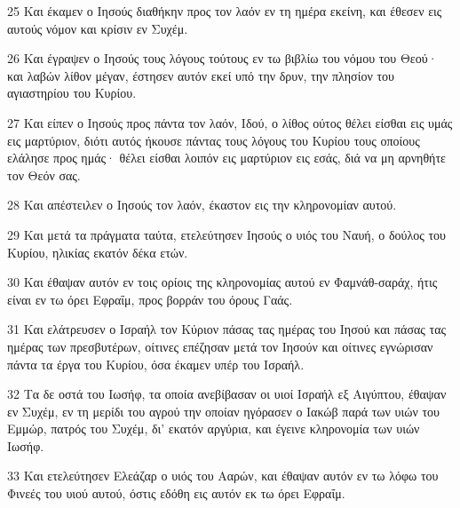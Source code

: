 \par 25 Και έκαμεν ο Ιησούς διαθήκην προς τον λαόν εν τη ημέρα εκείνη, και έθεσεν εις αυτούς νόμον και κρίσιν εν Συχέμ.
\par 26 Και έγραψεν ο Ιησούς τους λόγους τούτους εν τω βιβλίω του νόμου του Θεού· και λαβών λίθον μέγαν, έστησεν αυτόν εκεί υπό την δρυν, την πλησίον του αγιαστηρίου του Κυρίου.
\par 27 Και είπεν ο Ιησούς προς πάντα τον λαόν, Ιδού, ο λίθος ούτος θέλει είσθαι εις υμάς εις μαρτύριον, διότι αυτός ήκουσε πάντας τους λόγους του Κυρίου τους οποίους ελάλησε προς ημάς· θέλει είσθαι λοιπόν εις μαρτύριον εις εσάς, διά να μη αρνηθήτε τον Θεόν σας.
\par 28 Και απέστειλεν ο Ιησούς τον λαόν, έκαστον εις την κληρονομίαν αυτού.
\par 29 Και μετά τα πράγματα ταύτα, ετελεύτησεν Ιησούς ο υιός του Ναυή, ο δούλος του Κυρίου, ηλικίας εκατόν δέκα ετών.
\par 30 Και έθαψαν αυτόν εν τοις ορίοις της κληρονομίας αυτού εν Φαμνάθ-σαράχ, ήτις είναι εν τω όρει Εφραΐμ, προς βορράν του όρους Γαάς.
\par 31 Και ελάτρευσεν ο Ισραήλ τον Κύριον πάσας τας ημέρας του Ιησού και πάσας τας ημέρας των πρεσβυτέρων, οίτινες επέζησαν μετά τον Ιησούν και οίτινες εγνώρισαν πάντα τα έργα του Κυρίου, όσα έκαμεν υπέρ του Ισραήλ.
\par 32 Τα δε οστά του Ιωσήφ, τα οποία ανεβίβασαν οι υιοί Ισραήλ εξ Αιγύπτου, έθαψαν εν Συχέμ, εν τη μερίδι του αγρού την οποίαν ηγόρασεν ο Ιακώβ παρά των υιών του Εμμώρ, πατρός του Συχέμ, δι' εκατόν αργύρια, και έγεινε κληρονομία των υιών Ιωσήφ.
\par 33 Και ετελεύτησεν Ελεάζαρ ο υιός του Ααρών, και έθαψαν αυτόν εν τω λόφω του Φινεές του υιού αυτού, όστις εδόθη εις αυτόν εκ τω όρει Εφραΐμ.


